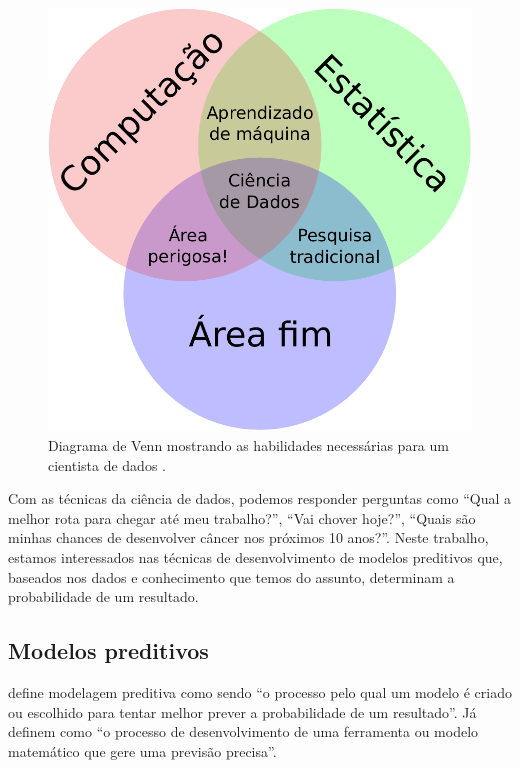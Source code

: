 \documentclass[a4paper,titlepage]{ppgi}\usepackage[]{graphicx}\usepackage[]{color}
\begin{document}
\begin{figure}[h]
\includegraphics{ciencia-de-dados-diagrama-venn}
\caption{Diagrama de Venn mostrando as habilidades necessárias para um
cientista de dados \cite{Conway2013}.}
\label{fig:ciencia-de-dados-venn}
\end{figure}

Com as técnicas da ciência de dados, podemos responder perguntas como ``Qual a
melhor rota para chegar até meu trabalho?'', ``Vai chover hoje?'', ``Quais são
minhas chances de desenvolver câncer nos próximos 10 anos?''. Neste trabalho,
estamos interessados nas técnicas de desenvolvimento de modelos preditivos que,
baseados nos dados e conhecimento que temos do assunto, determinam a
probabilidade de um resultado.

\subsection{Modelos preditivos}

 define modelagem preditiva como sendo ``o processo
pelo qual um modelo é criado ou escolhido para tentar melhor prever a
probabilidade de um resultado''. Já  definem como ``o
processo de desenvolvimento de uma ferramenta ou modelo matemático que gere uma
previsão precisa''.
\end{document}
